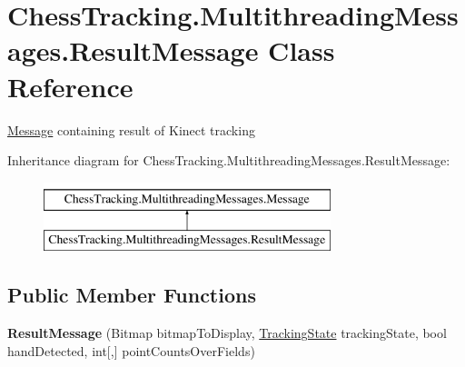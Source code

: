 \hypertarget{class_chess_tracking_1_1_multithreading_messages_1_1_result_message}{}\section{Chess\+Tracking.\+Multithreading\+Messages.\+Result\+Message Class Reference}
\label{class_chess_tracking_1_1_multithreading_messages_1_1_result_message}


\mbox{\hyperlink{class_chess_tracking_1_1_multithreading_messages_1_1_message}{Message}} containing result of Kinect tracking  


Inheritance diagram for Chess\+Tracking.\+Multithreading\+Messages.\+Result\+Message\+:\begin{figure}[H]
\begin{center}
\leavevmode
\includegraphics[height=2.000000cm]{class_chess_tracking_1_1_multithreading_messages_1_1_result_message}
\end{center}
\end{figure}
\subsection*{Public Member Functions}
\begin{DoxyCompactItemize}
\item 
\mbox{\label{class_chess_tracking_1_1_multithreading_messages_1_1_result_message_a3dccb9ca97e69146604ec9f43b5d3912}} 
{\bfseries Result\+Message} (Bitmap bitmap\+To\+Display, \mbox{\hyperlink{class_chess_tracking_1_1_multithreading_messages_1_1_tracking_state}{Tracking\+State}} tracking\+State, bool hand\+Detected, int\mbox{[},\mbox{]} point\+Counts\+Over\+Fields)
\end{DoxyCompactItemize}
